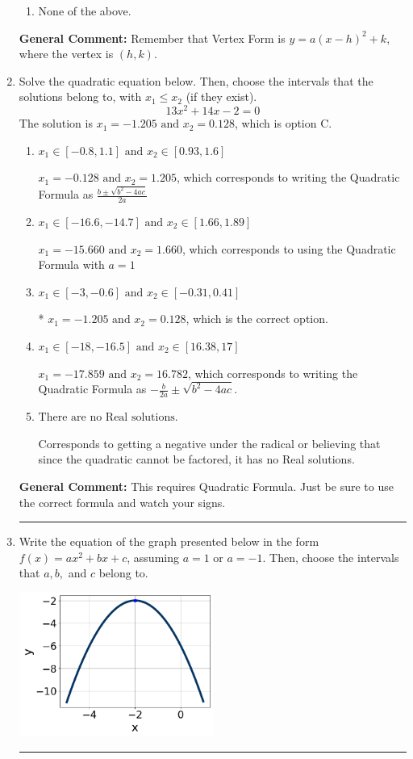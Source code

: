 \documentclass{extbook}[14pt]
\newcommand{\litem}[1]{\item #1

\rule{\textwidth}{0.4pt}}
\begin{document}
\begin{enumerate}
{\begin{enumerate}[label=\Alph*.]
\begin{multicols}{2}
\end{multicols}\item None of the above.\end{enumerate}
\textbf{General Comment:} Remember that Vertex Form is $y = a(x-h)^2+k$, where the vertex is $(h, k)$.
}
\litem{
Solve the quadratic equation below. Then, choose the intervals that the solutions belong to, with $x_1 \leq x_2$ (if they exist).
\[ 13x^{2} +14 x -2 = 0 \]The solution is \( x_1 = -1.205 \text{ and } x_2 = 0.128 \), which is option C.\begin{enumerate}[label=\Alph*.]
\item \( x_1 \in [-0.8, 1.1] \text{ and } x_2 \in [0.93, 1.6] \)

 $x_1 = -0.128 \text{ and } x_2 = 1.205$, which corresponds to writing the Quadratic Formula as $\frac{b \pm \sqrt{b^2 - 4ac}}{2a}$
\item \( x_1 \in [-16.6, -14.7] \text{ and } x_2 \in [1.66, 1.89] \)

 $x_1 = -15.660 \text{ and } x_2 = 1.660$, which corresponds to using the Quadratic Formula with $a=1$
\item \( x_1 \in [-3, -0.6] \text{ and } x_2 \in [-0.31, 0.41] \)

* $x_1 = -1.205 \text{ and } x_2 = 0.128$, which is the correct option.
\item \( x_1 \in [-18, -16.5] \text{ and } x_2 \in [16.38, 17] \)

 $x_1 = -17.859 \text{ and } x_2 = 16.782$, which corresponds to writing the Quadratic Formula as $-\frac{b}{2a} \pm \sqrt{b^2 - 4ac}$.
\item \( \text{There are no Real solutions.} \)

Corresponds to getting a negative under the radical or believing that since the quadratic cannot be factored, it has no Real solutions.
\end{enumerate}

\textbf{General Comment:} This requires Quadratic Formula. Just be sure to use the correct formula and watch your signs.
}
\litem{
Write the equation of the graph presented below in the form $f(x)=ax^2+bx+c$, assuming  $a=1$ or $a=-1$. Then, choose the intervals that $a, b,$ and $c$ belong to.

\begin{center}
    \includegraphics[width=0.5\textwidth]{../Figures/quadraticGraphToEquationA.png}
\end{center}


}
\end{enumerate}
\end{document}
